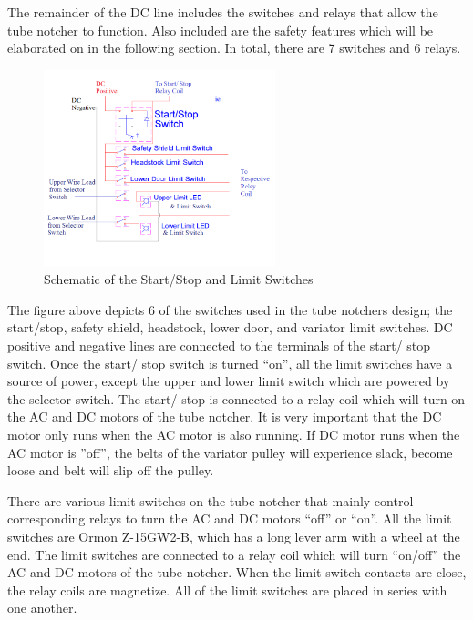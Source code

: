 \newpage
The remainder of the DC line includes the switches and relays that allow the tube notcher to function. Also included are the safety features which will be elaborated on in the following section. In total, there are 7 switches and 6 relays.

\begin{figure}[H]
    \centering
    \includegraphics[width=0.6\textwidth]{./images/Chapter2-MachineDescription/Switches}
    \caption{Schematic of the Start/Stop and Limit Switches}
    \label{fig:Electrical:Switches}
\end{figure} 

The figure above depicts 6 of the switches used in the tube notchers design; the start/stop, safety shield, headstock, lower door, and variator limit switches. DC positive and negative lines are connected to the terminals of the start/ stop switch. Once the start/ stop switch is turned ``on'', all the limit switches have a source of power, except the upper and lower limit switch which are powered by the selector switch. The start/ stop is connected to a relay coil which will turn on the AC and DC motors of the tube notcher. It is very important that the DC motor only runs when the AC motor is also running. If DC motor runs when the AC motor is ”off”, the belts of the variator pulley will experience slack, become loose and belt will slip off the pulley.

There are various limit switches on the tube notcher that mainly control corresponding relays to turn the AC and DC motors ``off'' or ``on''. All the limit switches are Ormon Z-15GW2-B, which has a long lever arm with a wheel at the end. The limit switches are connected to a relay coil which will turn ``on/off'' the AC and DC motors of the tube notcher. When the limit switch contacts are close, the relay coils are magnetize. All of the limit switches are placed in series with one another. 

